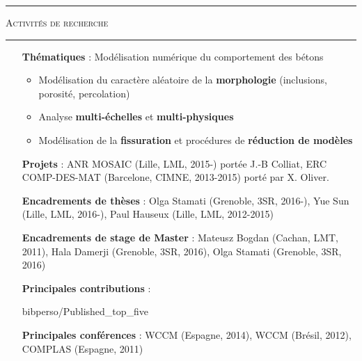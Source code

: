 \documentclass[a4paper,11pt]{article}
\newcommand{\titre}[1]{
  \begin{center}
    \rule{0.4\textwidth}{0.5pt}
    \par\vspace{0.1cm}
    \textsc{\large #1}
    \par\vspace{-0.2cm}
    \par\noindent\rule{0.4\textwidth}{0.5pt}
  \end{center}
}
\begin{document}
\titre{Activités de recherche}
\begin{itemize}
  \item[\textbf{Thématiques}] : Modélisation numérique du comportement des bétons
    \begin{itemize}
    \item Modélisation du caractère aléatoire de la \textbf{morphologie} (inclusions, porosité, percolation)
    \item Analyse \textbf{multi-échelles} et \textbf{multi-physiques}
    \item Modélisation de la \textbf{fissuration} et procédures de \textbf{réduction de modèles}
    \end{itemize}
  \item[\textbf{Projets}] : ANR MOSAIC (Lille, LML, 2015-) portée J.-B Colliat, ERC COMP-DES-MAT (Barcelone, CIMNE, 2013-2015) porté par X. Oliver.
  \item[\textbf{Encadrements de thèses}] : Olga Stamati (Grenoble, 3SR, 2016-), Yue Sun (Lille, LML, 2016-), Paul Hauseux (Lille, LML, 2012-2015)
  \item[\textbf{Encadrements de stage de Master}] : Mateusz Bogdan (Cachan, LMT, 2011), Hala Damerji (Grenoble, 3SR, 2016), Olga Stamati (Grenoble, 3SR, 2016)
  \item[\textbf{Principales contributions}] :
    \NoAutoSpaceBeforeFDP
    \begin{btSect}{bibperso/Published_top_five}
      \btPrintAll
    \end{btSect}
    \AutoSpaceBeforeFDP
  \item[\textbf{Principales conférences}] : WCCM (Espagne, 2014), WCCM (Brésil, 2012), COMPLAS (Espagne, 2011)
\end{itemize}
\vfill
\end{document}
